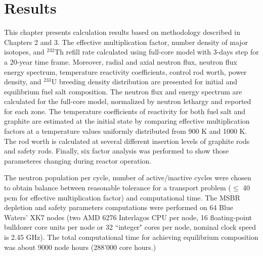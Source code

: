 \chapter[Results]{Results}

This chapter presents calculation results based on methodology described in Chapters 2 and 3. The effective multiplication factor, number density of major isotopes, and $^{232}$Th refill rate calculated using full-core model with 3-days step for a 20-year time frame. Moreover, radial and axial neutron flux, neutron flux energy spectrum, temperature reactivity coefficients, control rod worth, power density, and $^{233}$U breeding density distribution are presented for initial and equilibrium fuel salt composition. The neutron flux and energy spectrum are calculated for the full-core model, normalized by neutron lethargy and reported for each zone. The temperature coefficients of reactivity for both fuel salt and graphite are estimated at the initial state by comparing effective multiplication factors at a temperature values uniformly distributed from 900 K and 1000 K. The rod worth is calculated at several different insertion levels of graphite rods and safety rods. Finally, six factor analysis was performed to show those parameteres changing during reactor operation.

The neutron population per cycle, number of active/inactive cycles were chosen to obtain balance between reasonable tolerance for a transport problem ($\leq$ 40 pcm for effective multiplication factor) and computational time. The \gls{MSBR} depletion and safety parameters computations were performed on 64 Blue Waters' XK7 nodes (two AMD 6276 Interlagos CPU per node, 16 floating-point bulldozer core units per node or 32 ``integer" cores per node, nominal clock speed is 2.45 GHz). The total computational time for achieving equilibrium composition was about 9000 node hours (288'000 core hours.)

